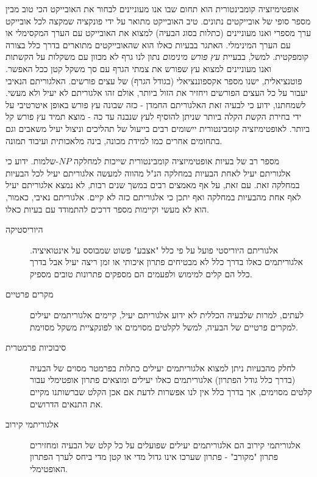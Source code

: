 \begin{hebrew}
אופטימיזציה קומבינטורית הוא תחום שבו אנו מעוניינים לבחור את האובייקט הכי טוב מבין מספר סופי של אובייקטים נתונים.
טיב האובייקט מתואר על ידי פונקציה שמקצה לכל אובייקט ערך מספרי ואנו מעוניינים (כתלות בסוג הבעיה) למצוא את האובייקט עם הערך המקסימלי או עם הערך המינימלי.
האתגר בבעיות כאלו הוא שהאובייקטים מתוארים בדרך כלל בצורה קומפקטית.
למשל, בבעיית
\emph{עץ פורש מינימום}
נתון לנו גרף לא מכוון עם משקלות על הקשתות ואנו מעוניינים למצוא עץ שפורש את צמתי הגרף עם סך משקל קטן ככל האפשר.
פוטנציאלית, ישנו מספר אקספוננציאלי (בגודל הגרף) של עצים פורשים.
האלגוריתם הנאיבי יעבור על כל העצים הפורשים ויחזיר את הזול ביותר, אולם זהו אלגוריתם לא יעיל ולא מעשי.
לשמחתנו, ידוע כי לבעיה זאת האלגוריתם החמדן - כזה שבונה עץ פורש באופן איטרטיבי על ידי בחירת הקשת הקלה ביותר שניתן להוסיף לעץ שנבנה עד כה - מוצא תמיד עץ פורש קל ביותר.
לאופטימיזציה קומבינטורית יישומים רבים בייעול של תהליכים וניצול יעיל משאבים וגם בתחומים אחרים כמו למידת מכונה, בינה מלאכותית ועיבוד תמונה.

מספר רב של בעיות אופטימיזציה קומבינטורית שייכות למחלקה $NP$-שלמות.
ידוע כי אלגוריתם יעיל לאחת הבעיות במחלקה הנ"ל מהווה למעשה אלגוריתם יעיל לכל הבעיות במחלקה זאת.
עם זאת, על אף מאמצים רבים במשך שנים רבות, לא נמצא אלגוריתם יעיל לאף אחת מהבעיות במחלקה ואף יתכן כי אלגוריתם כזה לא קיים.
אלגוריתם נאיבי, כאמור, הוא לא מעשי וקיימות מספר דרכים להתמודד עם בעיות כאלו.

\begin{description}
\item[\texthebrew{היוריסטיקה}]
אלגוריתם היוריסטי פועל על פי כלל "אצבע" פשוט שמבוסס על אינטואיציה.
אלגוריתמים כאלו בדרך כלל לא מבטיחים פתרון איכותי או זמן ריצה יעיל אבל בדרך כלל הם קלים למימוש ולפעמים הם מספקים פתרונות טובים מספיק.
\item[\texthebrew{מקרים פרטיים}]
לעתים, למרות שלבעיה הכללית לא ידוע אלגוריתם יעיל, קיימים אלגוריתמים יעילים למקרים פרטיים של הבעיה, למשל לקלטים מסוימים או לפונקציית משקל מסוימת.
\item[\texthebrew{סיבוכיות פרמטרית}]
לחלק מהבעיות ניתן למצוא אלגוריתמים יעילים כתלות בפרמטר מסוים של הבעיה (בדרך כלל גודל הפתרון) אלגוריתמים כאלו יעילים ומוצאים פתרון אופטימלי עבור קלטים מסוימים,
אך בדרך כלל אין לנו אפשרות לדעת אם אכן הקלט שברשותנו מקיים את התנאים הדרושים.
\item[\texthebrew{אלגוריתמי קירוב}]
אלגוריתמי קירוב הם אלגוריתמים יעילים שפועלים על כל קלט של הבעיה ומחזירים פתרון "מקורב" - פתרון שערכו אינו גדול מדי או קטן מדי ביחס לערך הפתרון האופטימלי.

\end{description}

\end{hebrew}
